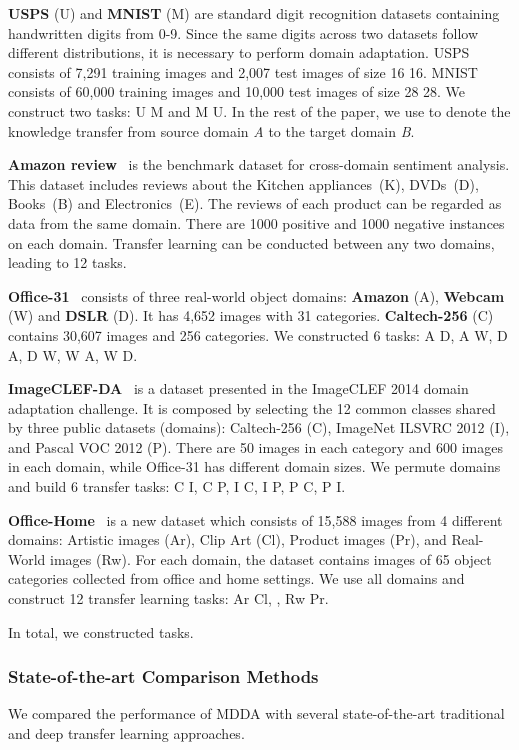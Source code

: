 \documentclass[acmsmall]{acmart}
\begin{document}
\textbf{USPS} (U) and \textbf{MNIST} (M) are standard digit recognition datasets containing handwritten digits from 0-9. Since the same digits across two datasets follow different distributions, it is necessary to perform domain adaptation. USPS consists of 7,291 training images and 2,007 test images of size 16  16. MNIST consists of 60,000 training images and 10,000 test images of size 28  28. We construct two tasks: U  M and M  U. In the rest of the paper, we use  to denote the knowledge transfer from source domain \textit{A} to the target domain \textit{B}.

\textbf{Amazon review}~\cite{blitzer2006domain} is the benchmark dataset for cross-domain sentiment analysis. This dataset includes reviews about the Kitchen appliances~(K), DVDs~(D), Books~(B) and Electronics~(E). The reviews of each product can be regarded as data from the same domain. There are 1000 positive and 1000 negative instances on each domain. Transfer learning can be conducted between any two domains, leading to 12 tasks.

\textbf{Office-31}~\cite{saenko2010adapting} consists of three real-world object domains: \textbf{Amazon} (A), \textbf{Webcam} (W) and \textbf{DSLR} (D). It has 4,652 images with 31 categories. \textbf{Caltech-256} (C) contains 30,607 images and 256 categories. We constructed 6 tasks: A  D, A  W, D  A, D  W, W  A, W  D.

\textbf{ImageCLEF-DA}~\cite{long2017deep} is a dataset presented in the ImageCLEF 2014 domain adaptation challenge. It is composed by selecting the 12 common classes shared by three public
datasets (domains): Caltech-256 (C), ImageNet ILSVRC 2012 (I), and Pascal VOC 2012 (P). There
are 50 images in each category and 600 images in each domain, while Office-31 has different domain
sizes. We permute domains and build 6 transfer tasks: C  I, C  P, I  C, I  P, P  C,  P  I.

\textbf{Office-Home}~\cite{venkateswara2017deep} is a new dataset which consists of 15,588 images from 4 different domains: Artistic images (Ar), Clip Art (Cl), Product images (Pr), and Real-World images (Rw). For each domain, the dataset contains images of 65 object categories collected from office and home settings. We use all domains and construct 12 transfer learning tasks: Ar  Cl, , Rw  Pr.

In total, we constructed  tasks.



\subsubsection{State-of-the-art Comparison Methods}
We compared the performance of MDDA with several state-of-the-art traditional and deep transfer learning approaches.
\end{document}
